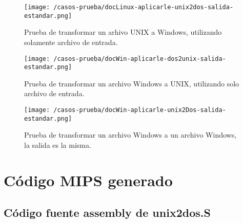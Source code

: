 \documentclass[a4paper]{article}
\begin{document}
\begin{figure}[!htp]
\begin{center}
\texttt{[image: /casos-prueba/docLinux-aplicarle-unix2dos-salida-estandar.png]}
\caption{Prueba de transformar un arhivo UNIX a Windows, utilizando solamente archivo de entrada.} \label{fig001}
\end{center}
\end{figure}

\begin{figure}[!htp]
\begin{center}
\texttt{[image: /casos-prueba/docWin-aplicarle-dos2unix-salida-estandar.png]}
\caption{Prueba de transformar un archivo Windows a UNIX, utilizando solo archivo de entrada.} \label{fig001}
\end{center}
\end{figure}

\begin{figure}[!htp]
\begin{center}
\texttt{[image: /casos-prueba/docWin-aplicarle-unix2Dos-salida-estandar.png]}
\caption{Prueba de transformar un archivo Windows a un archivo Windows, la salida es la misma.} \label{fig001}
\end{center}
\end{figure}

\pagebreak

\section{Código MIPS generado} 

\subsection{Código fuente assembly de unix2dos.S}
\end{document}

